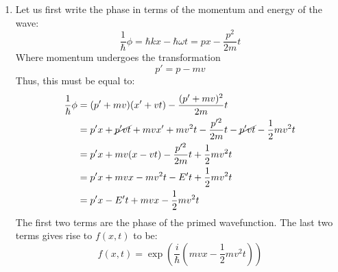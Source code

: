 \begin{sol}
\begin{enumerate}[label=\textbf{(\alph*)}]
\item Let us first write the phase in terms of the momentum and energy of the wave:
$$\frac{1}{\hbar}\phi=\hbar kx-\hbar \omega t = px - \frac{p^2}{2m}t$$
Where momentum undergoes the transformation
$$p'=p-mv$$
Thus, this must be equal to:
\begin{align*}
    \frac{1}{\hbar}\phi &= (p'+mv)(x'+vt)-\frac{(p'+mv)^2}{2m}t \\
    &= p'x + \cancel{p'vt}+mvx'+mv^2t-\frac{p'^2}{2m}t-\cancel{p'vt}-\frac{1}{2}mv^2t \\
    &= p'x + mv(x-vt) - \frac{p'^2}{2m}t+\frac{1}{2}mv^2t \\
    &= p'x+mvx-mv^2t - E't + \frac{1}{2}mv^2t \\
    &= p'x-E't+mvx-\frac{1}{2}mv^2t
\end{align*}
The first two terms are the phase of the primed wavefunction. The last two terms gives rise to $f(x,t)$ to be:
$$f(x,t)=\exp\left(\frac{i}{\hbar}\left(mvx-\frac{1}{2}mv^2t\right)\right)$$
\end{enumerate}
\end{sol}